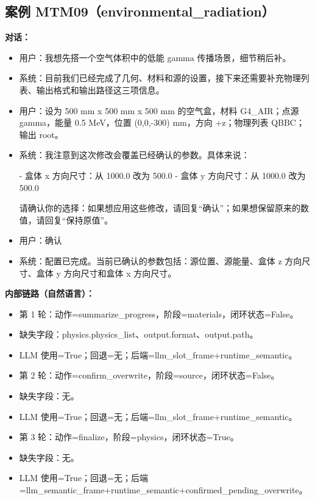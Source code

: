 \documentclass[11pt]{ctexart}
\begin{document}
\subsection{案例 MTM09（environmental\_radiation）}
\textbf{对话：}
\begin{itemize}
\item 用户：我想先搭一个空气体积中的低能 gamma 传播场景，细节稍后补。
\item 系统：目前我们已经完成了几何、材料和源的设置，接下来还需要补充物理列表、输出格式和输出路径这三项信息。
\item 用户：设为 500 mm x 500 mm x 500 mm 的空气盒，材料 G4\_AIR；点源 gamma，能量 0.5 MeV，位置 (0,0,-300) mm，方向 +z；物理列表 QBBC；输出 root。
\item 系统：我注意到这次修改会覆盖已经确认的参数。具体来说：

- 盒体 x 方向尺寸：从 1000.0 改为 500.0
- 盒体 y 方向尺寸：从 1000.0 改为 500.0

请确认你的选择：如果想应用这些修改，请回复“确认”；如果想保留原来的数值，请回复“保持原值”。
\item 用户：确认
\item 系统：配置已完成。当前已确认的参数包括：源位置、源能量、盒体 z 方向尺寸、盒体 y 方向尺寸和盒体 x 方向尺寸。
\end{itemize}
\textbf{内部链路（自然语言）：}
\begin{itemize}
\item 第 1 轮：动作=summarize\_progress，阶段=materials，闭环状态=False。
\item 缺失字段：physics.physics\_list、output.format、output.path。
\item LLM 使用=True；回退=无；后端=llm\_slot\_frame+runtime\_semantic。
\item 第 2 轮：动作=confirm\_overwrite，阶段=source，闭环状态=False。
\item 缺失字段：无。
\item LLM 使用=True；回退=无；后端=llm\_slot\_frame+runtime\_semantic。
\item 第 3 轮：动作=finalize，阶段=physics，闭环状态=True。
\item 缺失字段：无。
\item LLM 使用=True；回退=无；后端=llm\_semantic\_frame+runtime\_semantic+confirmed\_pending\_overwrite。
\end{itemize}
\end{document}
